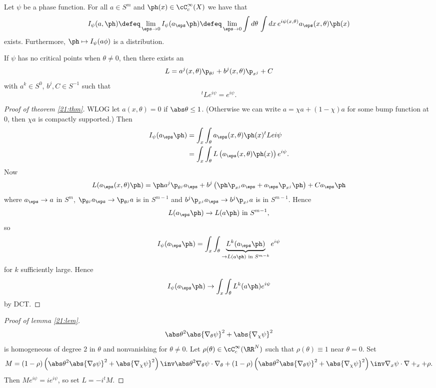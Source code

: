 \begin{thm}\label{21:thm}
  Let $\psi$ be a phase function.
  For all $a\in S^m$ and $\ph(x)\in\cC_c^\infty(X)$ we have that
  \[ I_\psi(a,\ph) \defeq \lim_{\eps\to0} I_\psi(a_\eps\ph) \defeq \lim_{\eps\to0} \int d\theta\, \int dx\,  e^{i\psi(x,\theta)} a_\eps(x,\theta) \ph(x) \]
  exists.
  Furthermore, $\ph\mapsto I_\psi(a\phi)$ is a distribution.
\end{thm}

\begin{lem}\label{21:lem}
  If $\psi$ has no critical points when $\theta\neq0$, then there exists an
  \[ L = a^j(x,\theta)\p_{\theta^j} + b^j(x,\theta)\p_{x^j} + C \]
  with $a^k\in S^0$, $b^j,C\in S^{-1}$ such that
  \[ {}^tLe^{i\psi}=e^{i\psi}. \]
\end{lem}

\begin{proof}[Proof of theorem \ref{21:thm}]
  WLOG let $a(x,\theta)=0$ if $\abs\theta\leq1$.
  (Otherwise we can write $a=\chi a+(1-\chi)a$ for some bump function at $0$, then $\chi a$ is compactly supported.)
  Then
  \begin{align*}
    I_\psi(a_\eps\ph) &= \int_x \int_\theta a_\eps(x,\theta) \ph(x) {}^tLe{i\psi} \\
    &= \int_x \int_\theta L\left( a_\eps(x,\theta)\ph(x) \right) e^{i\psi}.
  \end{align*}
  Now
  \[ L(a_\eps(x,\theta)\ph) = \ph a^j\p_{\theta^j}a_\eps + b^j\left( \ph\p_{x^j}a_\eps + a_\eps\p_{x^j}\ph \right) + C a_\eps\ph \]
  where $a_\eps\to a$ in $S^m$, $\p_{\theta^j}a_\eps\to\p_{\theta^j}a$ is in $S^{m-1}$ and $b^j\p_{x^j}a_\eps\to b^j\p_{x^j}a$ is in $S^{m-1}$.
  Hence
  \[ L(a_\eps\ph) \to L(a\ph) \text{ in } S^{m-1}, \]
  so
  \[ I_\psi(a_\eps\ph) = \int_x \int_\theta \underbrace{L^k(a_\eps\ph)}_{\to L(a\ph) \text{ in } S^{m-k}}e^{i\psi} \]
  for $k$ sufficiently large.
  Hence
  \[ I_\psi(a_\eps\ph) \to \int_x\int_\theta L^k(a\ph)e^{i\psi} \]
  by DCT.
\end{proof}

\begin{proof}[Proof of lemma \ref{21:lem}]
  \[ \abs\theta^2\abs{\nabla_\theta\psi}^2+\abs{\nabla_\chi\psi}^2 \]
  is homogeneous of degree $2$ in $\theta$ and nonvanishing for $\theta\neq0$.
  Let $\rho(\theta)\in\cC_c^\infty(\RR^N)$ such that $\rho(\theta)\equiv1$ near $\theta=0$.
  Set
  \[ M=(1-\rho)\left( \abs\theta^2\abs{\nabla_\theta\psi}^2+\abs{\nabla_\chi\psi}^2 \right)\inv\abs\theta^2\nabla_\theta\psi\cdot\nabla_\theta + (1-\rho)\left( \abs\theta^2\abs{\nabla_\theta\psi}^2+\abs{\nabla_\chi\psi}^2 \right)\inv\nabla_x\psi\cdot\nabla+_x + \rho. \]
  Then $Me^{i\psi}=ie^{i\psi}$, so set $L=-i{}^tM$.
\end{proof}

